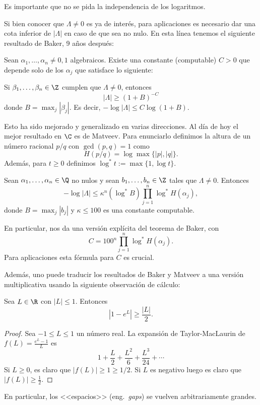 \documentclass[11pt, reqno]{amsart}
\begin{document}
Es importante que no se pida la independencia de los logaritmos.

Si bien conocer que $\Lambda\neq 0$ es ya de interés, para aplicaciones es necesario dar una cota inferior de $|\Lambda|$ en caso de que sea no nulo.
En esta línea tenemos el siguiente resultado de Baker, 9 años después:
\begin{thm}[Baker, 1975]
	Sean $\alpha_1,\ldots,\alpha_n\neq 0,1$ algebraicos.
	Existe una constante (computable) $C>0$ que depende solo de los $\alpha_j$ que satisface lo siguiente: 

	Si $\beta_1,\ldots,\beta_n\in \Z$ cumplen que $\Lambda\neq 0$, entonces $$|\Lambda|\geq (1+B)^{-C}$$ donde $B=\max_{j}|\beta_j|$.
	Es decir, $-\log|\Lambda|\leq C\log(1+B)$.
\end{thm}

Esto ha sido mejorado y generalizado en varias direcciones. Al día de hoy el mejor resultado en $\C$ es de Matveev. Para enunciarlo definimos la altura de un número racional $p/q$ con $\gcd(p,q)=1$ como $$H(p/q)=\log\max\{|p|,|q|\}.$$ Además, para $t\geq 0$ definimos $\log^*t:=\max\{1,\log{t}\}$.

\begin{thm}[Matveev, 2000]
	Sean $\alpha_1,\ldots,\alpha_n\in \Q$ no nulos y sean $b_1,\ldots,b_n\in \Z$ tales que $\Lambda\neq 0$.
	Entonces
	\[
		-\log|\Lambda|\leq \kappa^n(\log^*B) \prod_{j=1}^n\log^*H(\alpha_j),
	\]
	donde $B=\max_j|b_j|$ y $\kappa \le 100$ es una constante computable.
\end{thm}

En particular, nos da una versión explícita del teorema de Baker, con
\[
	C=100^n\prod_{j=1}^n\log^*H(\alpha_j).
\]
Para aplicaciones esta fórmula para $C$ es crucial.

Además, uno puede traducir los resultados de Baker y Matveev a una versión multiplicativa usando la siguiente observación de cálculo:

\begin{lem}
	Sea $L\in \R$ con $|L|\leq 1$. Entonces $$|1-e^L|\geq \frac{|L|}{2}.$$
\end{lem}
\begin{proof}
	Sea $-1\leq L\leq 1$ un número real. La expansión de Taylor-MacLaurin de $f(L)=\frac{e^L-1}{L}$ es
	\[
		1+\frac{L}{2}+\frac{L^2}{6}+\frac{L^3}{24}+\cdots
	\]
	Si $L\geq 0$, es claro que $|f(L)|\geq 1\geq 1/2$. Si $L$ es negativo luego es claro que $|f(L)|\geq \frac{1}{2}$.
\end{proof}
En particular, los <<espacios>> (eng.\ \textit{gaps}) se vuelven arbitrariamente grandes.
\end{document}
